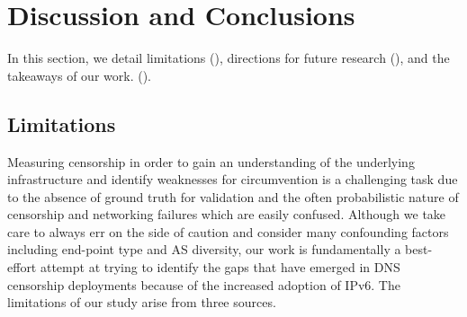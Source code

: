 \section{Discussion and Conclusions} \label{sec:v4vsv6-discussion}

In this section, we detail limitations
(), directions for future research
(), and the takeaways of our work.
().

%

\subsection{Limitations}
\label{sec:v4vsv6-discussion:limitations}
Measuring censorship in order to gain an understanding of the underlying
infrastructure and identify weaknesses for circumvention is a challenging task
due to the absence of ground truth for validation and the often probabilistic
nature of censorship and networking failures which are easily confused.
%
Although we take care to always err on the side of caution and consider many
confounding factors including end-point type and AS diversity, our work is
fundamentally a best-effort attempt at trying to identify the gaps that have
emerged in DNS censorship deployments because of the increased adoption of
IPv6. The limitations of our study arise from three sources.

